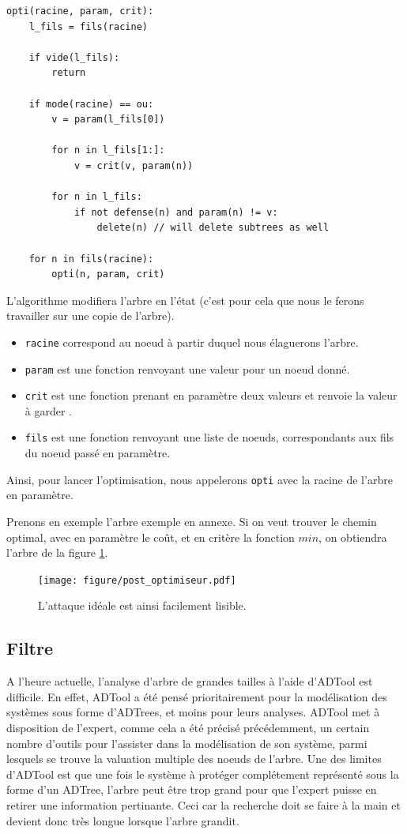 		\begin{lstlisting}
opti(racine, param, crit):
	l_fils = fils(racine)

	if vide(l_fils):
		return

	if mode(racine) == ou:
		v = param(l_fils[0])

		for n in l_fils[1:]:
			v = crit(v, param(n))

		for n in l_fils:
			if not defense(n) and param(n) != v:
				delete(n) // will delete subtrees as well
	
	for n in fils(racine):
		opti(n, param, crit)
		\end{lstlisting}

		L'algorithme modifiera l'arbre en l'état (c'est pour cela que nous le ferons travailler sur une copie de l'arbre).
		\begin{itemize}
			\item \verb|racine| correspond au noeud à partir duquel nous élaguerons l'arbre.
			\item \verb|param| est une fonction renvoyant une valeur pour un noeud donné.
			\item \verb|crit| est une fonction prenant en paramètre deux valeurs et renvoie la valeur à \og garder \fg.
			\item \verb|fils| est une fonction renvoyant une liste de noeuds, correspondants aux fils du noeud passé en paramètre.
		\end{itemize}
		Ainsi, pour lancer l'optimisation, nous appelerons \verb|opti| avec la racine de l'arbre en paramètre.

		Prenons en exemple l'arbre exemple en annexe.
		Si on veut trouver le chemin optimal, avec en paramètre le coût, et en critère la fonction $min$, on obtiendra l'arbre de la figure \ref{fig:arbre_post_opti}.

		\begin{figure}
			\centering
			\texttt{[image: figure/post\_optimiseur.pdf]}
			\caption{L'attaque idéale est ainsi facilement lisible.}
			\label{fig:arbre_post_opti}
		\end{figure}


	\subsection{Filtre}

		A l'heure actuelle, l'analyse d'arbre de grandes tailles à l'aide d'ADTool est difficile. 
		En effet, ADTool a été pensé prioritairement pour la modélisation des systèmes sous forme d'ADTrees, et moins pour leurs analyses. 
		ADTool met à disposition de l'expert, comme cela a été précisé précédemment, un certain nombre d'outils pour l'assister dans la modélisation de son système, parmi lesquels se trouve la valuation multiple des noeuds de l'arbre. 
		Une des limites d'ADTool est que une fois le système à protéger complétement représenté sous la forme d'un ADTree, l'arbre peut être trop grand pour que l'expert puisse en retirer une information pertinante. Ceci car la recherche doit se faire à la main et devient donc très longue lorsque l'arbre grandit. 

